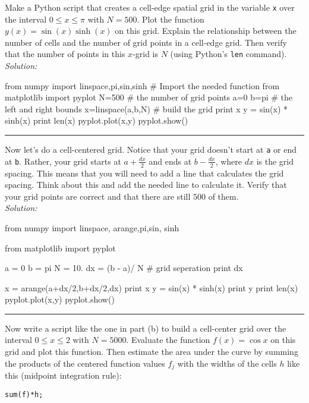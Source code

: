\begin{enumerate}
\probtwo \label{P:1.1}
\begin{enumerate}
  \subprob \label{P:1.1a} Make a Python script that creates a
  cell-edge spatial grid in the variable {\tt x} over the interval $0 \le x \le \pi$ with $N=500$.
    Plot the function $y(x) = \sin(x) \sinh(x)$ on this grid.
    Explain the relationship between the number of cells and
    the number of grid points in a cell-edge grid. Then
    verify that the number of points in this $x$-grid is $N$
    (using Python's {\tt len} command).\\
\ifsolutions
\textit{Solution:}\\
\begin{codeexample}
\begin{VerbatimOut}{\listingFile}
from numpy import linspace,pi,sin,sinh  # Import the needed function
from matplotlib import pyplot
N=500             # the number of grid points
a=0
b=pi          # the left and right bounds
x=linspace(a,b,N)           # build the grid
print x
y = sin(x) * sinh(x)
print len(x)
pyplot.plot(x,y)
pyplot.show()
\end{VerbatimOut}
\end{codeexample}
\else
\noindent\rule{4 in}{0.01 in}
\fi

    \subprob \label{P:1.1b} Now let's do a cell-centered grid.  Notice
    that your grid doesn't start at \texttt{a} or end at \texttt{b}.
    Rather, your grid starts at $a + \frac{dx}{2}$ and ends at $b -
    \frac{dx}{2}$, where $dx$ is the grid spacing.  This means that
    you will need to add a line that calculates the grid spacing.
    Think about this and add the needed line to calculate it.  Verify
    that your grid points are correct and that there are still $500$ of them.\\
\ifsolutions
\textit{Solution:}\\
\begin{codeexample}
\begin{VerbatimOut}{\listingFile}
from numpy import linspace, arange,pi,sin, sinh

from matplotlib import pyplot

a = 0
b = pi
N = 10.
dx = (b  - a)/ N  # grid seperation
print dx

x = arange(a+dx/2,b+dx/2,dx)
print x
y = sin(x) * sinh(x)
print y
print len(x)
pyplot.plot(x,y)
pyplot.show()
\end{VerbatimOut}
\end{codeexample}
\else
\noindent\rule{4 in}{0.01 in}
\fi
    \subprob Now write a script like the one in part (b) to build a cell-center
    grid over the interval $0 \le x \le 2$ with $N=5000$. Evaluate the
    function $f(x)=\cos{x}$ on this grid and plot this function. Then
    estimate the area under the curve by summing the products of the
    centered function values $f_j$ with the widths of the cells $h$
    like this (midpoint integration rule):
\begin{Verbatim}
sum(f)*h;
\end{Verbatim}


\end{enumerate}
\end{enumerate}
